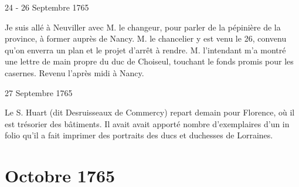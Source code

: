                      \begin{diary}{24 - 26 Septembre 1765}{}
                        
                         Je suis allé à Neuviller avec M. le changeur, pour
                           parler de la pépinière de la
                              province, à former
                           auprès de Nancy. M. le chancelier y est venu
                           le 26, convenu qu'on enverra un plan
                           et le
                           projet d'arrêt à rendre. M.
                              l'intendant m'a montré
                           une lettre de main propre du duc de
                              Choiseul,
                           touchant le fonds promis pour les casernes. Revenu l'après midi à Nancy. \bigskip
        
        
                     \end{diary}

                     \begin{diary}{27 Septembre 1765}{}
                        
                        
                           Le S. Huart (dit Desruisseaux de
                              Commercy)
                           repart demain pour Florence,
                           où il est
                           trésorier des bâtiments. Il avait avait
                           apporté
                           nombre d'exemplaires d'un in folio qu'il a fait
                           imprimer des portraits des ducs et duchesses
                           de Lorraines. \bigskip
        
        
                     \end{diary}
                  \chapter*{Octobre 1765}
                     
